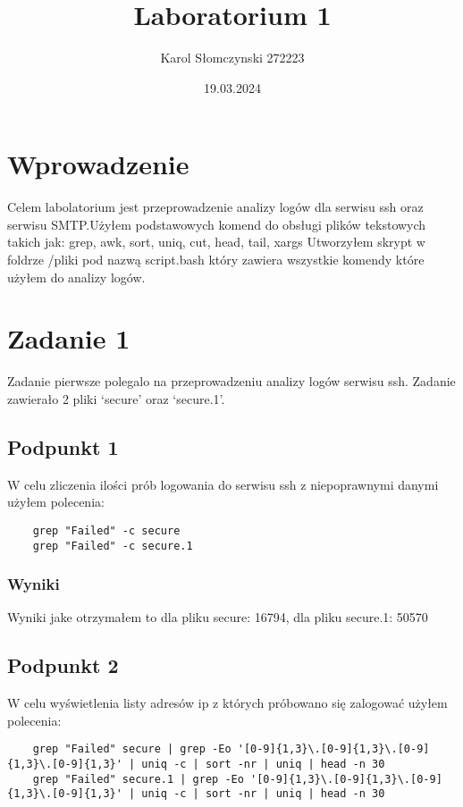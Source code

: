 \documentclass{article}
\title{Laboratorium 1}
\author{Karol Słomczynski 272223}
\date{19.03.2024}
\begin{document}
\maketitle
\tableofcontents
\newpage
\section{Wprowadzenie}
Celem labolatorium jest przeprowadzenie analizy logów dla serwisu ssh oraz serwisu SMTP.\@ Użyłem podstawowych komend do obsługi plików tekstowych takich jak: grep, awk, sort, uniq, cut, head, tail, xargs
Utworzyłem skrypt w foldrze /pliki pod nazwą script.bash który zawiera wszystkie komendy które użyłem do analizy logów.
\section{Zadanie 1}
Zadanie pierwsze polegalo na przeprowadzeniu analizy logów serwisu ssh. Zadanie zawierało 2 pliki `secure' oraz `secure.1'.
\subsection{Podpunkt 1}
W celu zliczenia ilości prób logowania do serwisu ssh z niepoprawnymi danymi użyłem polecenia:
\begin{verbatim}
    grep "Failed" -c secure
    grep "Failed" -c secure.1 
\end{verbatim}
\subsubsection{Wyniki}
Wyniki jake otrzymałem to dla pliku secure:  16794, dla pliku secure.1:  50570
\subsection{Podpunkt 2}
W celu wyświetlenia listy adresów ip z których próbowano się zalogować użyłem polecenia:
\begin{verbatim}
    grep "Failed" secure | grep -Eo '[0-9]{1,3}\.[0-9]{1,3}\.[0-9]{1,3}\.[0-9]{1,3}' | uniq -c | sort -nr | uniq | head -n 30
    grep "Failed" secure.1 | grep -Eo '[0-9]{1,3}\.[0-9]{1,3}\.[0-9]{1,3}\.[0-9]{1,3}' | uniq -c | sort -nr | uniq | head -n 30
\end{verbatim}
\end{document}

